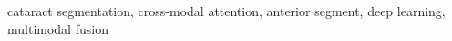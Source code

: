 \documentclass[conference]{IEEEtran}
\begin{document}
\begin{IEEEkeywords}
    cataract segmentation, cross-modal attention, anterior segment, deep learning, multimodal fusion
\end{IEEEkeywords}










\end{document}
